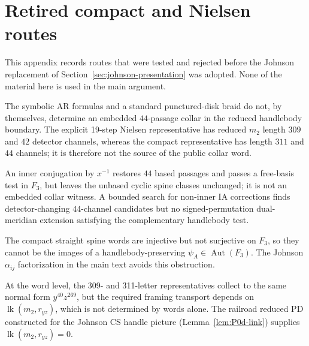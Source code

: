\section{Retired compact and Nielsen routes}\label{app:retired-routes}

This appendix records routes that were tested and rejected before the
Johnson replacement of Section~\ref{sec:johnson-presentation} was adopted.
None of the material here is used in the main argument.

The symbolic AR formulas and a standard punctured-disk braid do not, by
themselves, determine an embedded $44$-passage collar in the reduced
handlebody boundary.  The explicit 19-step Nielsen representative has reduced
$m_2$ length $309$ and $42$ detector channels, whereas the compact
representative has length $311$ and $44$ channels; it is therefore not the
source of the public collar word.

An inner conjugation by $x^{-1}$ restores $44$ based passages and passes a
free-basis test in $F_3$, but leaves the unbased cyclic spine classes
unchanged; it is not an embedded collar witness.  A bounded search for
non-inner IA corrections finds detector-changing $44$-channel candidates but
no signed-permutation dual-meridian extension satisfying the complementary
handlebody test.

The compact straight spine words are injective but not surjective on $F_3$,
so they cannot be the images of a handlebody-preserving
$\psi_A\in\operatorname{Aut}(F_3)$.  The Johnson $\alpha_{ij}$ factorization
in the main text avoids this obstruction.

At the word level, the 309- and 311-letter representatives collect to the
same normal form $y^{40}z^{269}$, but the required framing transport depends
on $\operatorname{lk}(m_2,r_{yz})$, which is not determined by words alone.
The railroad reduced PD constructed for the Johnson CS handle picture
(Lemma~\ref{lem:P0d-link}) supplies $\operatorname{lk}(m_2,r_{yz})=0$.
